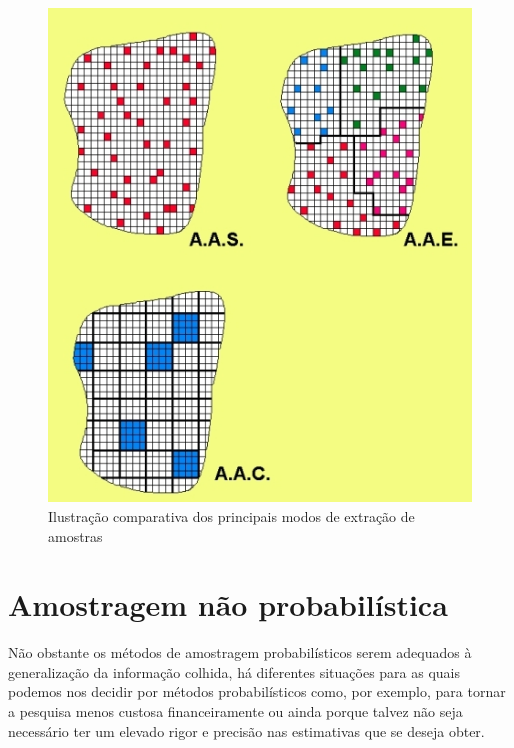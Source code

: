 \documentclass[
]{book}
\begin{document}
\begin{figure}

{\centering \includegraphics[width=1\linewidth]{images7/simples_estratos_conglomerados} 

}

\caption{Ilustração comparativa dos principais modos de extração de amostras}\label{fig:fig41}
\end{figure}

\hypertarget{amostragem-nuxe3o-probabiluxedstica}{%
\section{Amostragem não probabilística}\label{amostragem-nuxe3o-probabiluxedstica}}

\hfill\break

Não obstante os métodos de amostragem probabilísticos serem adequados à generalização da informação colhida, há diferentes situações para as quais podemos nos decidir por métodos probabilísticos como, por exemplo, para tornar a pesquisa menos custosa financeiramente ou ainda porque talvez não seja necessário ter um elevado rigor e precisão nas estimativas que se deseja obter.
\end{document}
